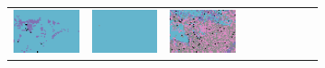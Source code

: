 \documentclass{ipol}
\begin{document}
\begin{figure}[ht]
\begin{subfigure}[t]{\linewidth}
\begin{tabular}{ccccccccc}
                \includegraphics[width=\s]{images/night/AHD/iso_64_grids.png}&
                \includegraphics[width=\s]{images/night/DCB/iso_64_grids.png}&
                \includegraphics[width=\s]{images/night/DHT/iso_64_grids.png}&

\end{tabular}
\end{subfigure}
\end{figure}
\end{document}
